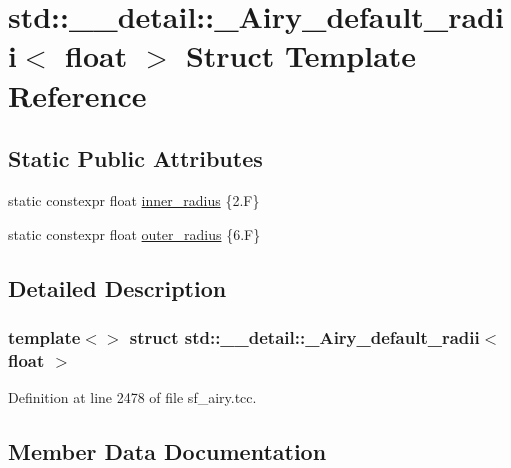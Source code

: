 \hypertarget{structstd_1_1____detail_1_1__Airy__default__radii_3_01float_01_4}{}\section{std\+:\+:\+\_\+\+\_\+detail\+:\+:\+\_\+\+Airy\+\_\+default\+\_\+radii$<$ float $>$ Struct Template Reference}
\label{structstd_1_1____detail_1_1__Airy__default__radii_3_01float_01_4}
\subsection*{Static Public Attributes}
\begin{DoxyCompactItemize}
\item 
static constexpr float \hyperlink{structstd_1_1____detail_1_1__Airy__default__radii_3_01float_01_4_a798f4ff51a7e6a7dc5d0e5a670899c3a}{inner\+\_\+radius} \{2.\+F\}
\item 
static constexpr float \hyperlink{structstd_1_1____detail_1_1__Airy__default__radii_3_01float_01_4_ad8ea3a344f9748cf9bf32bcc17ca5d0b}{outer\+\_\+radius} \{6.\+F\}
\end{DoxyCompactItemize}


\subsection{Detailed Description}
\subsubsection*{template$<$$>$\newline
struct std\+::\+\_\+\+\_\+detail\+::\+\_\+\+Airy\+\_\+default\+\_\+radii$<$ float $>$}



Definition at line 2478 of file sf\+\_\+airy.\+tcc.



\subsection{Member Data Documentation}
\mbox{\label{structstd_1_1____detail_1_1__Airy__default__radii_3_01float_01_4_a798f4ff51a7e6a7dc5d0e5a670899c3a}} 
